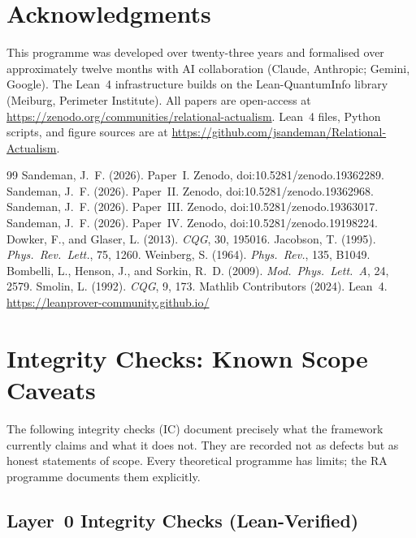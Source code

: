 \documentclass[12pt,a4paper]{article}
\begin{document}
\section*{Acknowledgments}

This programme was developed over twenty-three years and formalised over approximately twelve months with AI collaboration (Claude, Anthropic; Gemini, Google).  The Lean~4 infrastructure builds on the Lean-QuantumInfo library (Meiburg, Perimeter Institute).  All papers are open-access at \url{https://zenodo.org/communities/relational-actualism}.  Lean~4 files, Python scripts, and figure sources are at \url{https://github.com/jsandeman/Relational-Actualism}.


\begin{thebibliography}{99}
 Sandeman, J.~F. (2026). Paper~I. Zenodo, doi:10.5281/zenodo.19362289.
 Sandeman, J.~F. (2026). Paper~II. Zenodo, doi:10.5281/zenodo.19362968.
 Sandeman, J.~F. (2026). Paper~III. Zenodo, doi:10.5281/zenodo.19363017.
 Sandeman, J.~F. (2026). Paper~IV. Zenodo, doi:10.5281/zenodo.19198224.
 Dowker, F., and Glaser, L. (2013). \textit{CQG}, 30, 195016.
 Jacobson, T. (1995). \textit{Phys.\ Rev.\ Lett.}, 75, 1260.
 Weinberg, S. (1964). \textit{Phys.\ Rev.}, 135, B1049.
 Bombelli, L., Henson, J., and Sorkin, R.~D. (2009). \textit{Mod.\ Phys.\ Lett.~A}, 24, 2579.
 Smolin, L. (1992). \textit{CQG}, 9, 173.
 Mathlib Contributors (2024). Lean~4. \url{https://leanprover-community.github.io/}
\end{thebibliography}

\section{Integrity Checks: Known Scope Caveats}\label{sec:ic}

The following integrity checks (IC) document precisely what the framework currently claims and what it does not.  They are recorded not as defects but as honest statements of scope.  Every theoretical programme has limits; the RA programme documents them explicitly.

\subsection{Layer~0 Integrity Checks (Lean-Verified)}
\end{document}
